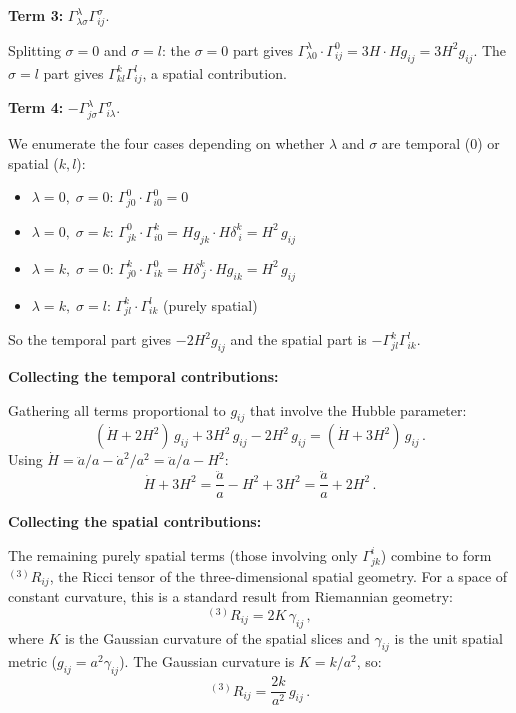 \medskip\noindent\textbf{Term 3:} $\Gamma^\lambda_{\lambda\sigma}\Gamma^\sigma_{ij}$.

Splitting $\sigma=0$ and $\sigma=l$: the $\sigma=0$ part gives $\Gamma^\lambda_{\lambda 0}\cdot\Gamma^0_{ij}=3H\cdot Hg_{ij}=3H^2g_{ij}$. The $\sigma=l$ part gives $\Gamma^k_{kl}\Gamma^l_{ij}$, a spatial contribution.

\medskip\noindent\textbf{Term 4:} $-\Gamma^\lambda_{j\sigma}\Gamma^\sigma_{i\lambda}$.

We enumerate the four cases depending on whether $\lambda$ and $\sigma$ are temporal (0) or spatial ($k,l$):

\begin{itemize}
    \item $\lambda=0,\;\sigma=0$: $\Gamma^0_{j0}\cdot\Gamma^0_{i0}=0$
    \item $\lambda=0,\;\sigma=k$: $\Gamma^0_{jk}\cdot\Gamma^k_{i0}=Hg_{jk}\cdot H\delta^k_{\ i}=H^2\,g_{ij}$
    \item $\lambda=k,\;\sigma=0$: $\Gamma^k_{j0}\cdot\Gamma^0_{ik}=H\delta^k_{\ j}\cdot Hg_{ik}=H^2\,g_{ij}$
    \item $\lambda=k,\;\sigma=l$: $\Gamma^k_{jl}\cdot\Gamma^l_{ik}$ (purely spatial)
\end{itemize}
So the temporal part gives $-2H^2g_{ij}$ and the spatial part is $-\Gamma^k_{jl}\Gamma^l_{ik}$.

\medskip\noindent\textbf{Collecting the temporal contributions:}

Gathering all terms proportional to $g_{ij}$ that involve the Hubble parameter:
\begin{equation}\label{eq:temporal}
    (\dot{H}+2H^2)\,g_{ij} + 3H^2\,g_{ij} - 2H^2\,g_{ij} = (\dot{H}+3H^2)\,g_{ij}\,.
\end{equation}
Using $\dot{H}=\ddot{a}/a-\dot{a}^2/a^2=\ddot{a}/a-H^2$:
\begin{equation}
    \dot{H}+3H^2 = \frac{\ddot{a}}{a}-H^2+3H^2 = \frac{\ddot{a}}{a}+2H^2\,.
\end{equation}

\medskip\noindent\textbf{Collecting the spatial contributions:}

The remaining purely spatial terms (those involving only $\Gamma^i_{jk}$) combine to form ${}^{(3)}\!R_{ij}$, the Ricci tensor of the three-dimensional spatial geometry. For a space of constant curvature, this is a standard result from Riemannian geometry:
\begin{equation}
    {}^{(3)}\!R_{ij} = 2K\,\gamma_{ij}\,,
\end{equation}
where $K$ is the Gaussian curvature of the spatial slices and $\gamma_{ij}$ is the unit spatial metric ($g_{ij}=a^2\gamma_{ij}$). The Gaussian curvature is $K=k/a^2$, so:
\begin{equation}
    {}^{(3)}\!R_{ij} = \frac{2k}{a^2}\,g_{ij}\,.
\end{equation}

